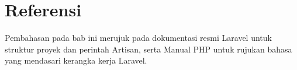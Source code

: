 \section{Referensi}

Pembahasan pada bab ini merujuk pada dokumentasi resmi Laravel
\cite{laraveldocs} untuk struktur proyek dan perintah Artisan, serta
Manual PHP \cite{phpmanual} untuk rujukan bahasa yang mendasari kerangka
kerja Laravel.
